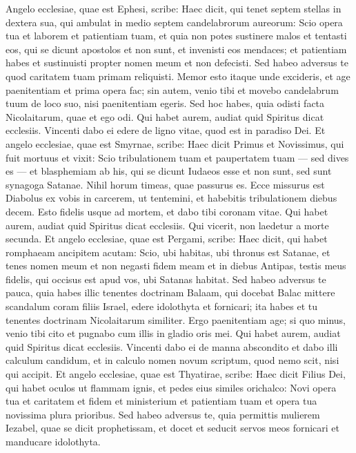 \begin{biblechapter}  
\verse Angelo ecclesiae, quae est Ephesi, scribe: Haec dicit, qui tenet septem stellas in dextera sua, qui ambulat in medio septem candelabrorum aureorum: 
\verse Scio opera tua et laborem et patientiam tuam, et quia non potes sustinere malos et tentasti eos, qui se dicunt apostolos et non sunt, et invenisti eos mendaces; 
\verse et patientiam habes et sustinuisti propter nomen meum et non defecisti. 
\verse Sed habeo adversus te quod caritatem tuam primam reliquisti. 
\verse Memor esto itaque unde excideris, et age paenitentiam et prima opera fac; sin autem, venio tibi et movebo candelabrum tuum de loco suo, nisi paenitentiam egeris. 
\verse Sed hoc habes, quia odisti facta Nicolaitarum, quae et ego odi. 
\verse Qui habet aurem, audiat quid Spiritus dicat ecclesiis. Vincenti dabo ei edere de ligno vitae, quod est in paradiso Dei. 
\verse Et angelo ecclesiae, quae est Smyrnae, scribe: Haec dicit Primus et Novissimus, qui fuit mortuus et vixit: 
\verse Scio tribulationem tuam et paupertatem tuam — sed dives es — et blasphemiam ab his, qui se dicunt Iudaeos esse et non sunt, sed sunt synagoga Satanae. 
\verse Nihil horum timeas, quae passurus es. Ecce missurus est Diabolus ex vobis in carcerem, ut tentemini, et habebitis tribulationem diebus decem. Esto fidelis usque ad mortem, et dabo tibi coronam vitae. 
\verse Qui habet aurem, audiat quid Spiritus dicat ecclesiis. Qui vicerit, non laedetur a morte secunda. 
\verse Et angelo ecclesiae, quae est Pergami, scribe: Haec dicit, qui habet romphaeam ancipitem acutam: 
\verse Scio, ubi habitas, ubi thronus est Satanae, et tenes nomen meum et non negasti fidem meam et in diebus Antipas, testis meus fidelis, qui occisus est apud vos, ubi Satanas habitat.  
\verse Sed habeo adversus te pauca, quia habes illic tenentes doctrinam Balaam, qui docebat Balac mittere scandalum coram filiis Israel, edere idolothyta et fornicari; 
\verse ita habes et tu tenentes doctrinam Nicolaitarum similiter.  
\verse Ergo paenitentiam age; si quo minus, venio tibi cito et pugnabo cum illis in gladio oris mei. 
\verse Qui habet aurem, audiat quid Spiritus dicat ecclesiis. Vincenti dabo ei de manna abscondito et dabo illi calculum candidum, et in calculo nomen novum scriptum, quod nemo scit, nisi qui accipit. 
\verse Et angelo ecclesiae, quae est Thyatirae, scribe: Haec dicit Filius Dei, qui habet oculos ut flammam ignis, et pedes eius similes orichalco: 
\verse Novi opera tua et caritatem et fidem et ministerium et patientiam tuam et opera tua novissima plura prioribus. 
\verse Sed habeo adversus te, quia permittis mulierem Iezabel, quae se dicit prophetissam, et docet et seducit servos meos fornicari et manducare idolothyta. 

\end{biblechapter}
